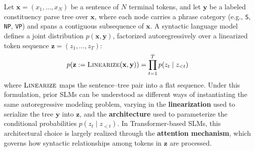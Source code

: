 \documentclass[11pt]{article}
\begin{document}
Let $\mathbf{x} = (x_1, \ldots, x_N)$ be a sentence of $N$ terminal tokens, and let $\mathbf{y}$ be a labeled constituency parse tree over $\mathbf{x}$, where each node carries a phrase category (e.g., \texttt{S}, \texttt{NP}, \texttt{VP}) and spans a contiguous subsequence of $\mathbf{x}$.
A syntactic language model defines a joint distribution $p(\mathbf{x}, \mathbf{y})$, factorized autoregressively over a linearized token sequence $\mathbf{z} = (z_1, \ldots, z_T)$:
\begin{equation}
p(\mathbf{z} := \textsc{Linearize}(\mathbf{x}, \mathbf{y})) = \prod_{t=1}^{T} p(z_t \mid z_{<t})
\label{eq:joint}
\end{equation}
where $\textsc{Linearize}$ maps the sentence--tree pair into a flat sequence. Under this formulation, prior SLMs can be understood as different ways of instantiating the same autoregressive modeling problem, varying in the \textbf{linearization} used to serialize the tree $\mathbf{y}$ into $\mathbf{z}$, and the \textbf{architecture} used to parameterize the conditional probabilities $p(z_t \mid z_{<t})$. In Transformer-based SLMs, this architectural choice is largely realized through the \textbf{attention mechanism}, which governs how syntactic relationships among tokens in 
$\mathbf{z}$ are processed.





\end{document}
